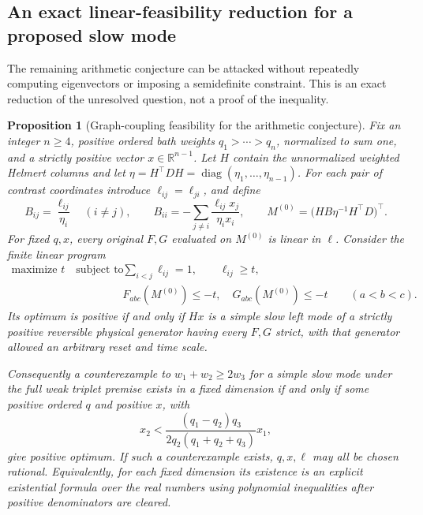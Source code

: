 \documentclass[11pt]{article}
\newtheorem{proposition}{Proposition}
\begin{document}
\subsection{An exact linear-feasibility reduction for a proposed slow mode}
\label{sec:arithmeticlp}
The remaining arithmetic conjecture can be attacked without repeatedly
computing eigenvectors or imposing a semidefinite constraint. This is an
exact reduction of the unresolved question, not a proof of the inequality.

\begin{proposition}[Graph-coupling feasibility for the arithmetic conjecture]
Fix an integer $n\geq4$, positive ordered bath weights $q_1>\cdots>q_n$, normalized to sum one,
and a strictly positive vector $x\in\mathbb R^{n-1}$. Let $H$ contain the
unnormalized weighted Helmert columns and let
$\eta=H^\top D H=\operatorname{diag}(\eta_1,\ldots,\eta_{n-1})$.
For each pair of contrast coordinates introduce $\ell_{ij}=\ell_{ji}$,
and define
\[
B_{ij}=\frac{\ell_{ij}}{\eta_i}\quad(i\ne j),\qquad
B_{ii}=-\sum_{j\ne i}\frac{\ell_{ij}x_j}{\eta_i x_i},\qquad
M^{(0)}=\bigl(HB\eta^{-1}H^\top D\bigr)^\top.
\]
For fixed $q,x$, every original $F,G$ evaluated on $M^{(0)}$ is linear
in $\ell$. Consider the finite linear program
\begin{align*}
\text{maximize }t\quad\text{subject to }&
\sum_{i<j}\ell_{ij}=1,\qquad \ell_{ij}\geq t,\\
&F_{abc}(M^{(0)})\leq-t,\quad
G_{abc}(M^{(0)})\leq-t \qquad(a<b<c).
\end{align*}
Its optimum is positive if and only if $Hx$ is a simple slow left mode
of a strictly positive reversible physical generator having every
$F,G$ strict, with that generator allowed an arbitrary reset and time scale.

Consequently a counterexample to $w_1+w_2\geq2w_3$ for a simple slow mode under the full weak
triplet premise exists in a fixed dimension if and only if some positive
ordered $q$ and positive $x$, with
\[
x_2<\frac{(q_1-q_2)q_3}{2q_2(q_1+q_2+q_3)}x_1,
\]
give positive optimum. If such a counterexample exists, $q,x,\ell$ may
all be chosen rational. Equivalently, for each fixed dimension its
existence is an explicit existential formula over the real numbers
using polynomial inequalities after positive denominators are cleared.
\end{proposition}
\end{document}
